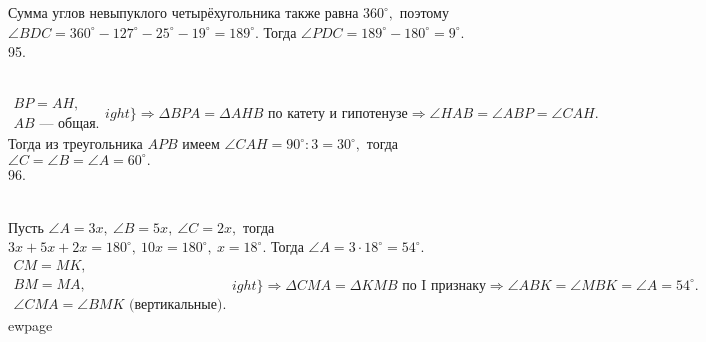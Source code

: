 Сумма углов невыпуклого четырёхугольника также равна $360^\circ,$ поэтому $\angle BDC=360^\circ-127^\circ-25^\circ-19^\circ=189^\circ.$ Тогда $\angle PDC=189^\circ-180^\circ=9^\circ.$\\
95. \begin{figure}[ht!]
\end{figure}\\
$\left.\begin{array}{l}BP=AH,\\
AB\text{ --- общая.} \end{array}
ight\}\Rightarrow \Delta BPA=\Delta AHB\text{ по катету и гипотенузе}\Rightarrow \angle HAB=\angle ABP=\angle CAH.$ Тогда из треугольника $APB$ имеем $\angle CAH=90^\circ:3=30^\circ,$ тогда $\angle C=\angle B=\angle A=60^\circ.$\\
96. \begin{figure}[ht!]
\end{figure}\\
Пусть $\angle A=3x,\ \angle B=5x,\ \angle C=2x,$ тогда $3x+5x+2x=180^\circ,\ 10x=180^\circ,\ x=18^\circ.$ Тогда $\angle A=3\cdot18^\circ=54^\circ.$
$\left.\begin{array}{l}CM=MK,\\
BM=MA,\\
\angle CMA=\angle BMK\text{ (вертикальные).}\end{array}
ight\}\Rightarrow \Delta CMA=\Delta KMB\text{ по I признаку}\Rightarrow \angle ABK=\angle MBK=\angle A=54^\circ.$
ewpage

